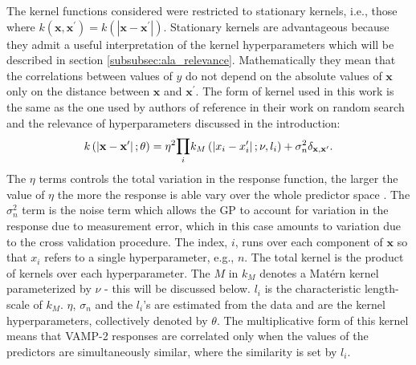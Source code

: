 The kernel functions considered were restricted to stationary kernels, i.e., those where $k(\mathbf{x}, \mathbf{x}^{\prime}) = k(|\mathbf{x} - \mathbf{x}^{\prime}|)$. Stationary kernels are advantageous because they admit a useful interpretation of the kernel hyperparameters which will be described in section \ref{subsubsec:ala_relevance}. Mathematically they mean that the correlations between values of $y$ do not depend on the absolute values of $\mathbf{x}$ only on the distance between $\mathbf{x}$ and $\mathbf{x}^{\prime}$.
The form of kernel used in this work is the same as the one used by authors of reference  \cite{bergstrajamesbergstraRandomSearchHyperParameter2012} in their work on random search and the relevance of hyperparameters discussed in the introduction: 
\begin{equation}\label{eqn:kernel_form}
    k\left(\left|\mathbf{x}-\mathbf{x}^{\prime}\right|; \theta\right) = 
    \eta^{2}\mathlarger{\prod}_i k_{M}\left(\left|x_{i}-x_{i}^{\prime}\right|; \nu, l_i\right)
    +\sigma_{n}^{2}\delta_{\mathbf{x}, \mathbf{x}^{\prime}}. 
\end{equation}
The $\eta$ terms controls the total variation in the response function, the larger the value of $\eta$ the more the response is able vary over the whole predictor space \cite{rasmussenGaussianProcessesMachine2006}. The $\sigma_{n}^{2}$ term is the noise \cite{rasmussenGaussianProcessesMachine2006} term which allows the GP to account for variation in the response due to measurement error, which in this case amounts to variation due to the cross validation procedure.  The index, $i$, runs over each component of $\mathbf{x}$ so that $x_{i}$ refers to a single hyperparameter, e.g., $n$. The total kernel is the product of kernels over each hyperparameter.  The $M$ in $k_{M}$ denotes a Mat\'ern kernel parameterized by $\nu$ - this will be discussed below. $l_{i}$ is the characteristic length-scale of $k_{M}$. $\eta$, $\sigma_{n}$ and the $l_{i}$'s are estimated from the data and are the kernel hyperparameters, collectively denoted by $\theta$. The multiplicative form of this kernel means that VAMP-2 responses are correlated only when the values of the predictors are simultaneously similar, where the similarity is set by $l_{i}$.    


